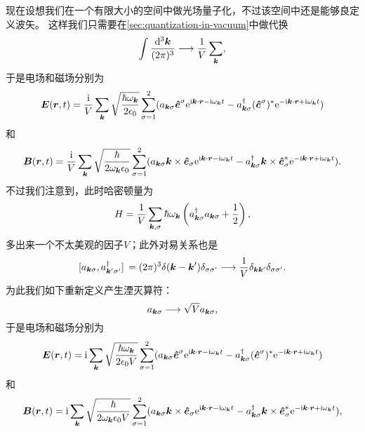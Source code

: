 现在设想我们在一个有限大小的空间中做光场量子化，不过该空间中还是能够良定义波矢。
这样我们只需要在\autoref{sec:quantization-in-vacuum}中做代换
\[
    \int \frac{\dd[3]{\vb*{k}}}{(2\pi)^3} \longrightarrow \frac{1}{V} \sum_{\vb*{k}},
\]
于是电场和磁场分别为
\begin{equation}
    \vb*{E}(\vb*{r}, t) = \frac{\mathrm{i}}{V} \sum_{\vb*{k}} \sqrt{\frac{\hbar \omega_{\vb*{k}}}{2 \epsilon_0}} \sum_{\sigma=1}^2 (a_{\vb*{k} \sigma} \vu*{e}^\sigma \mathrm{e}^{\mathrm{i} \vb*{k} \cdot \vb*{r} - \mathrm{i} \omega_{\vb*{k}} t} - a^\dagger_{\vb*{k} \sigma} (\vu*{e}^\sigma)^* \mathrm{e}^{- \mathrm{i} \vb*{k} \cdot \vb*{r} + \mathrm{i} \omega_{\vb*{k}} t})
    \label{eq:vacuum-e-field-cavity-origin}
\end{equation}
和
\begin{equation}
    \vb*{B}(\vb*{r}, t) = \frac{\mathrm{i}}{V} \sum_{\vb*{k}} \sqrt{\frac{\hbar}{2 \omega_{\vb*{k}} \epsilon_0}} \sum_{\sigma=1}^2 (a_{\vb*{k} \sigma} \vb*{k} \times \vu*{e}_\sigma \mathrm{e}^{\mathrm{i} \vb*{k} \cdot \vb*{r} - \mathrm{i} \omega_{\vb*{k}} t} - a^\dagger_{\vb*{k} \sigma} \vb*{k} \times \vu*{e}_\sigma^* \mathrm{e}^{- \mathrm{i} \vb*{k} \cdot \vb*{r} + \mathrm{i} \omega_{\vb*{k}} t}).
    \label{eq:vacuum-b-field-cavity-origin}
\end{equation}
不过我们注意到，此时哈密顿量为
\[
    H = \frac{1}{V} \sum_{\vb*{k}, \sigma} \hbar \omega_{\vb*{k}} \left( a^\dagger_{\vb*{k} \sigma} a_{\vb*{k} \sigma} + \frac{1}{2} \right),
\]
多出来一个不太美观的因子$V$；此外对易关系也是
\[
    \comm*{a_{\vb*{k} \sigma}}{a_{\vb*{k}' \sigma'}^\dagger} = (2\pi)^3 \delta(\vb*{k} - \vb*{k}') \delta_{\sigma \sigma'} \longrightarrow \frac{1}{V} \delta_{\vb*{k} \vb*{k}'} \delta_{\sigma \sigma'}.
\]
为此我们如下重新定义产生湮灭算符：
\begin{equation}
    a_{\vb*{k} \sigma} \longrightarrow \sqrt{V} a_{\vb*{k} \sigma},
\end{equation}
于是电场和磁场分别为
\begin{equation}
    \vb*{E}(\vb*{r}, t) = \mathrm{i} \sum_{\vb*{k}} \sqrt{\frac{\hbar \omega_{\vb*{k}}}{2 \epsilon_0 V}} \sum_{\sigma=1}^2 (a_{\vb*{k} \sigma} \vu*{e}^\sigma \mathrm{e}^{\mathrm{i} \vb*{k} \cdot \vb*{r} - \mathrm{i} \omega_{\vb*{k}} t} - a^\dagger_{\vb*{k} \sigma} (\vu*{e}^\sigma)^* \mathrm{e}^{- \mathrm{i} \vb*{k} \cdot \vb*{r} + \mathrm{i} \omega_{\vb*{k}} t})
    \label{eq:vacuum-e-field-cavity-1}
\end{equation}
和
\begin{equation}
    \vb*{B}(\vb*{r}, t) = \mathrm{i} \sum_{\vb*{k}} \sqrt{\frac{\hbar}{2 \omega_{\vb*{k}} \epsilon_0 V}} \sum_{\sigma=1}^2 (a_{\vb*{k} \sigma} \vb*{k} \times \vu*{e}_\sigma \mathrm{e}^{\mathrm{i} \vb*{k} \cdot \vb*{r} - \mathrm{i} \omega_{\vb*{k}} t} - a^\dagger_{\vb*{k} \sigma} \vb*{k} \times \vu*{e}_\sigma^* \mathrm{e}^{- \mathrm{i} \vb*{k} \cdot \vb*{r} + \mathrm{i} \omega_{\vb*{k}} t}),
    \label{eq:vacuum-b-field-cavity-1}
\end{equation}
